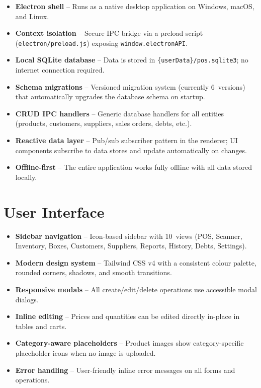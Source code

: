 \documentclass[12pt,a4paper]{article}
\begin{document}
\begin{itemize}[leftmargin=1.5em]
  \item \textbf{Electron shell} -- Runs as a native desktop application on
        Windows, macOS, and Linux.
  \item \textbf{Context isolation} -- Secure IPC bridge via a preload script
        (\texttt{electron/preload.js}) exposing \texttt{window.electronAPI}.
  \item \textbf{Local SQLite database} -- Data is stored in
        \texttt{\{userData\}/pos.sqlite3}; no internet connection required.
  \item \textbf{Schema migrations} -- Versioned migration system
        (currently 6~versions) that automatically upgrades the database schema
        on startup.
  \item \textbf{CRUD IPC handlers} -- Generic database handlers for all
        entities (products, customers, suppliers, sales orders, debts, etc.).
  \item \textbf{Reactive data layer} -- Pub/sub subscriber pattern in the
        renderer; UI components subscribe to data stores and update
        automatically on changes.
  \item \textbf{Offline-first} -- The entire application works fully offline
        with all data stored locally.
\end{itemize}

\section{User Interface}

\begin{itemize}[leftmargin=1.5em]
  \item \textbf{Sidebar navigation} -- Icon-based sidebar with 10~views (POS,
        Scanner, Inventory, Boxes, Customers, Suppliers, Reports, History,
        Debts, Settings).
  \item \textbf{Modern design system} -- Tailwind CSS v4 with a consistent
        colour palette, rounded corners, shadows, and smooth transitions.
  \item \textbf{Responsive modals} -- All create/edit/delete operations use
        accessible modal dialogs.
  \item \textbf{Inline editing} -- Prices and quantities can be edited
        directly in-place in tables and carts.
  \item \textbf{Category-aware placeholders} -- Product images show
        category-specific placeholder icons when no image is uploaded.
  \item \textbf{Error handling} -- User-friendly inline error messages on all
        forms and operations.
\end{itemize}
\end{document}
